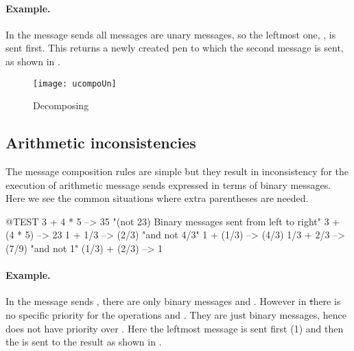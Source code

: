 \documentclass[a4paper,10pt,twoside]{book}
\begin{document}


\paragraph{Example.} In the message sends  all messages are unary messages, so the leftmost one, , is sent first. This returns a newly created pen to which the second message  is sent, as shown in .

\begin{figure}
	\centering
	\texttt{[image: ucompoUn]}
	\caption{Decomposing }
\end{figure}

\subsection{Arithmetic inconsistencies}
The message composition rules are simple but they result in inconsistency for the execution of arithmetic message sends expressed in terms of binary messages. Here we see the common situations where extra parentheses are needed. 

\begin{code}{@TEST}
3 + 4 * 5      --> 35    "(not 23)  Binary messages sent from left to right"
3 + (4 * 5)    --> 23
1 + 1/3         --> (2/3)    "and not 4/3"
1 + (1/3)       --> (4/3)
1/3 + 2/3       --> (7/9)    "and not 1"
(1/3) + (2/3)  --> 1
\end{code}

\paragraph{Example.} 
In the message sends , there are only binary messages \ct{+} and \ct{*}. However in \st there is no specific priority for the operations \ct{+} and \ct{*}. They are just binary messages, hence \ct{*} does not have priority over \ct{+}. Here the leftmost message \ct{+} is sent first (1) and then the \ct{*} is sent to the result as shown in .  
\end{document}
